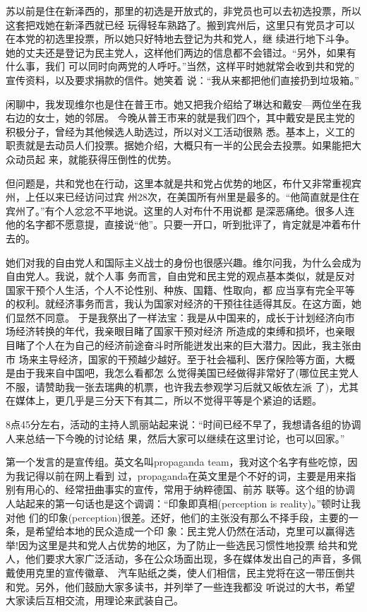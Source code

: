 ﻿\documentclass[11pt]{article}
\begin{document}
苏以前是住在新泽西的，那里的初选是开放式的，非党员也可以去初选投票，所以这套把戏她在新泽西就已经
玩得轻车熟路了。搬到宾州后，这里只有党员才可以在本党的初选里投票，所以她只好特地去登记为共和党人，继
续进行地下斗争。她的丈夫还是登记为民主党人，这样他们两边的信息都不会错过。``另外，如果有什么事，我们
可以同时向两党的人呼吁。''当然，这样平时她就常会收到共和党的宣传资料，以及要求捐款的信件。她笑着
说：``我从来都把他们直接扔到垃圾箱。''

闲聊中，我发现维尔也是住在普王市。她又把我介绍给了琳达和戴安---两位坐在我右边的女士，她的邻居。
今晚从普王市来的就是我们四个，其中戴安是民主党的积极分子，曾经为其他候选人助选过，所以对义工活动很熟
悉。基本上，义工的职责就是去动员人们投票。据她介绍，大概只有一半的公民会去投票。如果能把大众动员起
来，就能获得压倒性的优势。

但问题是，共和党也在行动，这里本就是共和党占优势的地区，布什又非常重视宾州，上任以来已经访问过宾
州28次，在美国所有州里是最多的。``他简直就是住在宾州了。''有个人忿忿不平地说。这里的人对布什不用说都
是深恶痛绝。很多人连他的名字都不愿意提，直接说``他''。只要一开口，听到批评了，肯定就是冲着布什去的。

她们对我的自由党人和国际主义战士的身份也很感兴趣。维尔问我，为什么会成为自由党人。我说，就个人事
务而言，自由党和民主党的观点基本类似，就是反对国家干预个人生活，个人不论性别、种族、国籍、性取向，都
应当享有完全平等的权利。就经济事务而言，我认为国家对经济的干预往往适得其反。在这方面，她们显然不同意。
于是我祭出了一样法宝：我是从中国来的，成长于计划经济向市场经济转换的年代，我亲眼目睹了国家干预对经济
所造成的束缚和损坏，也亲眼目睹了个人在为自己的经济前途奋斗时所能迸发出来的巨大潜力。因此，我主张由市
场来主导经济，国家的干预越少越好。至于社会福利、医疗保险等方面，大概是由于我来自中国吧，我怎么看都怎
么觉得美国已经做得非常好了(哪位民主党人不服，请赞助我一张去瑞典的机票，也许我去参观学习后就又皈依左派
了)，尤其在媒体上，更几乎是三分天下有其二，所以不觉得平等是个紧迫的话题。

8点45分左右，活动的主持人凯丽站起来说：``时间已经不早了，我想请各组的协调人来总结一下今晚的讨论结
果，然后大家可以继续在这里讨论，也可以回家。''

第一个发言的是宣传组。英文名叫propaganda team，我对这个名字有些吃惊，因为我记得以前在网上看到
过，propaganda在英文里是个不好的词，主要是用来指别有用心的、经常扭曲事实的宣传，常用于纳粹德国、前苏
联等。这个组的协调人站起来的第一句话也是这个调调：``印象即真相(perception is reality)。''顿时让我对他
们的印象(perception)很差。还好，他们的主张没有那么不择手段，主要的一条，是希望给本地的民众造成一个印
象：民主党人仍然在活动，克里可以赢得选举!因为这里是共和党人占优势的地区，为了防止一些选民习惯性地投票
给共和党人，他们要求大家广泛活动，多在公众场面出现，多在媒体发出自己的声音，多佩戴使用克里的宣传徽章、
汽车贴纸之类，使人们相信，民主党将在这一带压倒共和党。另外，他们鼓励大家多读书，并列举了一些连我都没
听说过的大书，希望大家读后互相交流，用理论来武装自己。
\end{document}
